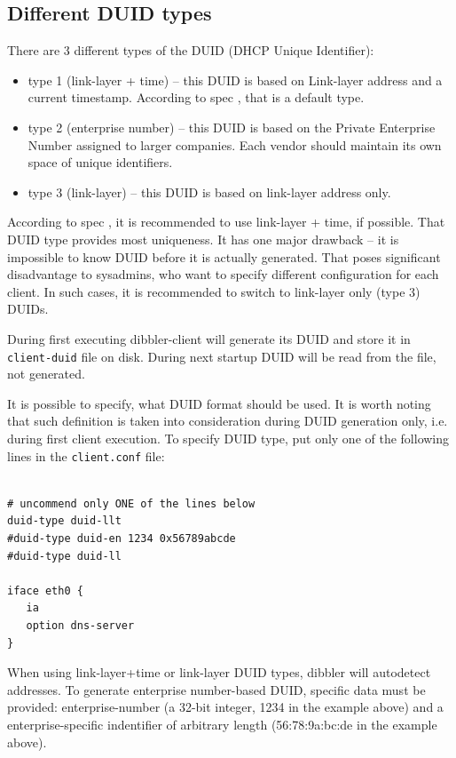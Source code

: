\subsection{Different DUID types}
\label{feature-duid-types}
There are 3 different types of the DUID (DHCP Unique Identifier):
\begin{itemize}
\item type 1 (link-layer + time) -- this DUID is based on Link-layer
  address and a current timestamp. According to spec \cite{rfc3315},
  that is a default type.
\item type 2 (enterprise number) -- this DUID is based on the Private
  Enterprise Number assigned to larger companies. Each vendor should
  maintain its own space of unique identifiers.
\item type 3 (link-layer) -- this DUID is based on link-layer address
  only.
\end{itemize}

According to spec \cite{rfc3315}, it is recommended to use link-layer
+ time, if possible. That DUID type provides most uniqueness. It has
one major drawback -- it is impossible to know DUID before it is
actually generated. That poses significant disadvantage to sysadmins,
who want to specify different configuration for each client. In such
cases, it is recommended to switch to link-layer only (type 3) DUIDs.

During first executing dibbler-client will generate its DUID and store
it in \verb+client-duid+ file on disk. During next startup DUID will
be read from the file, not generated. 

It is possible to specify, what DUID format should be used. It is
worth noting that such definition is taken into consideration during
DUID generation only, i.e. during first client execution. To specify
DUID type, put only one of the following lines in the
\verb+client.conf+ file:

\begin{lstlisting}

# uncommend only ONE of the lines below
duid-type duid-llt
#duid-type duid-en 1234 0x56789abcde
#duid-type duid-ll

iface eth0 {
   ia
   option dns-server
}
\end{lstlisting}

When using link-layer+time or link-layer DUID types, dibbler will
autodetect addresses. To generate enterprise number-based DUID,
specific data must be provided: enterprise-number (a 32-bit integer,
1234 in the example above) and a enterprise-specific indentifier of
arbitrary length (56:78:9a:bc:de in the example above).

